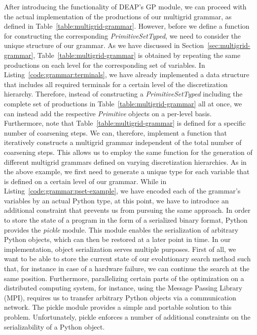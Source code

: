 After introducing the functionality of DEAP's GP module, we can proceed with the actual implementation of the productions of our multigrid grammar, as defined in Table~\ref{table:multigrid-grammar}.
However, before we define a function for constructing the corresponding \emph{PrimitiveSetTyped}, we need to consider the unique structure of our grammar.
As we have discussed in Section~\ref{sec:multigrid-grammar}, Table~\ref{table:multigrid-grammar} is obtained by repeating the same productions on each level for the corresponding set of variables.
In Listing~\ref{code:grammar:terminals}, we have already implemented a data structure that includes all required terminals for a certain level of the discretization hierarchy.
Therefore, instead of constructing a \emph{PrimitiveSetTyped} including the complete set of productions in Table~\ref{table:multigrid-grammar} all at once, we can instead add the respective \emph{Primitive} objects on a per-level basis.
Furthermore, note that Table~\ref{table:multigrid-grammar} is defined for a specific number of coarsening steps.
We can, therefore, implement a function that iteratively constructs a multigrid grammar independent of the total number of coarsening steps.
This allows us to employ the same function for the generation of different multigrid grammars defined on varying discretization hierarchies.
As in the above example, we first need to generate a unique type for each variable that is defined on a certain level of our grammar.
While in Listing~\ref{code:grammar:pset-example}, we have encoded each of the grammar's variables by an actual Python type, at this point, we have to introduce an additional constraint that prevents us from pursuing the same approach.
In order to store the state of a program in the form of a serialized binary format, Python provides the \emph{pickle} module.
This module enables the serialization of arbitrary Python objects, which can then be restored at a later point in time.
In our implementation, object serialization serves multiple purposes.
First of all, we want to be able to store the current state of our evolutionary search method such that, for instance in case of a hardware failure, we can continue the search at the same position.
Furthermore, parallelizing certain parts of the optimization on a distributed computing system, for instance, using the Message Passing Library (MPI), requires us to transfer arbitrary Python objects via a communication network.
The pickle module provides a simple and portable solution to this problem.
Unfortunately, pickle enforces a number of additional constraints on the serializability of a Python object.
